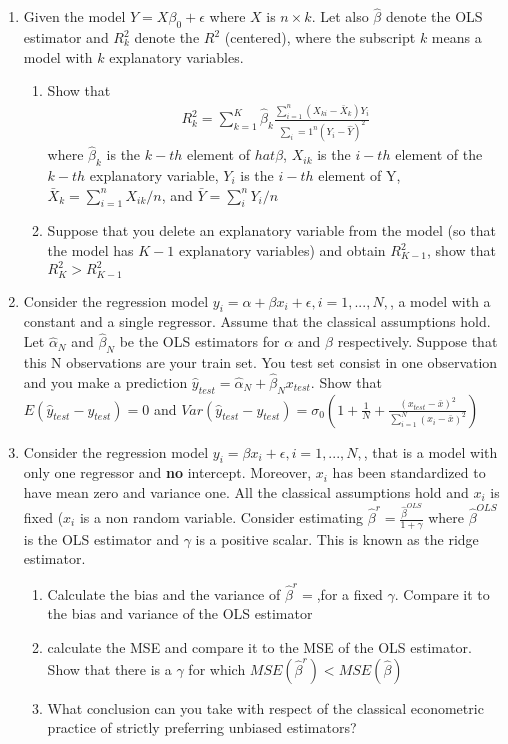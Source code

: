 \documentclass[12pt,onecolumn]{article}
\begin{document}
\begin{enumerate}
  \item Given the model $Y = X \beta_0 + \epsilon$ where $X$ is $n \times k$. Let also $\hat \beta$ denote the OLS estimator and $R^2_k$ denote the  $R^2$ (centered), where the subscript $k$ means a model with $k$ explanatory variables.
  \begin{enumerate}
    \item Show that 
    \begin{align}
      R^2_k = \sum_{k=1}^K \hat \beta_k \frac{\sum_{i=1}^n (X_{ki}-\bar{X}_k)Y_i}{\sum_i=1^n (Y_i-\hat Y)^2}
    \end{align}
    where $\hat \beta_k$ is the $k-th$ element of $hat \beta$, $X_{ik}$ is the $i-th$ element of the $k-th$ explanatory variable, $Y_i$ is the $i-th$ element of Y, $\bar X_k = \sum_{i=1}^n X_{ik}/n$, and $\bar Y = \sum_i^n Y_i/n$
    \item Suppose that you delete an explanatory variable from the model (so that the model has $K-1$ explanatory variables) and obtain $R^2_{K-1}$, show that $R^2_{K}>R^2_{K-1}$
  \end{enumerate}
        
  \item Consider the regression model $y_i = \alpha +\beta x_i +\epsilon, i=1,...,N,$, a model with a constant and a single regressor. Assume that the classical assumptions hold. Let $\hat \alpha_N$ and $\hat \beta_N$ be the OLS estimators for $\alpha$ and $\beta$ respectively. Suppose that this N observations are your train set. You test set consist in one observation and you make a prediction $\hat y_{test}=\hat \alpha_N + \hat \beta_N x_{test}$. Show that $E(\hat y_{test}-y_{test})=0$ and $Var(\hat y_{test}-y_{test})=\sigma_0 \left( 1+\frac{1}{N}+\frac{(x_{test}-\bar x)^2}{\sum_{i=1}^N (x_i-\bar x)^2 }\right)$
  
  
  
  
  \item Consider the regression model $y_i =  \beta x_i +\epsilon, i=1,...,N,$, that is a model with only one regressor and {\bf no} intercept. Moreover, $x_i$ has been standardized to have mean zero and variance one. All the classical assumptions hold and $x_i$ is fixed ($x_i$ is a non random variable. Consider estimating $\hat \beta^r= \frac{\hat \beta^{OLS}}{1+\gamma}$ where $\hat \beta^{OLS}$ is the OLS estimator and $\gamma$ is a positive scalar. This is known as the ridge estimator.
  \begin{enumerate}
	  \item Calculate the bias and the variance of $\hat \beta^r=$,for a fixed $\gamma$. Compare it to the bias and variance of the OLS estimator
	  \item calculate the MSE and compare it to the MSE of the OLS estimator. Show that there is a $\gamma$ for which $MSE(\hat \beta^r)<MSE(\hat \beta)$
	  \item What conclusion can you take with respect of the classical econometric practice of strictly preferring unbiased estimators?
\end{enumerate}
  
  

\end{enumerate}
\end{document}
